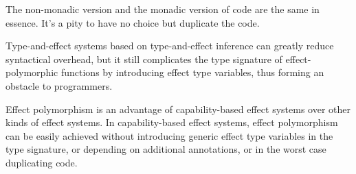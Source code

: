 The non-monadic version and the monadic version of code are the same
in essence. It's a pity to have no choice but duplicate the code.

Type-and-effect systems based on type-and-effect
inference\cite{talpin1992polymorphic, talpin1994type} can greatly
reduce syntactical overhead, but it still complicates the type
signature of effect-polymorphic functions by introducing effect type
variables, thus forming an obstacle to programmers.

Effect polymorphism is an advantage of capability-based effect systems
over other kinds of effect systems. In capability-based effect
systems, effect polymorphism can be easily achieved without
introducing generic effect type variables in the type signature, or
depending on additional annotations, or in the worst case duplicating
code.
